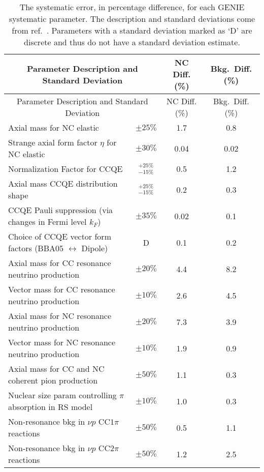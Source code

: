 \begin{doublespace}
\singlespacing
\begin{longtable}{p{3.5in} c c c}
  \caption[GENIE Systematic Errors]{The systematic error, in percentage difference, for each GENIE systematic parameter. The description and standard deviations come from ref.~\cite{ref:GENIE, ref:TNGENIE}. Parameters with a standard deviation marked as `D' are discrete and thus do not have a standard deviation estimate.} \tabularnewline
  \hline\hline
  \multicolumn{2}{c}{Parameter Description and Standard Deviation} & NC Diff. (\%) & Bkg.~Diff. (\%) \\
  \hline \endfirsthead
  \hline\hline
  \multicolumn{2}{c}{Parameter Description and Standard Deviation} & NC Diff. (\%) & Bkg.~Diff. (\%) \\
  \hline \endhead
  Axial mass for NC elastic & $\pm25\%$ & 1.7 & 0.8 \\
  Strange axial form factor $\eta$ for NC elastic & $\pm30\%$ & 0.04 & 0.02 \\
  Normalization Factor for CCQE & $^{+25\%}_{-15\%}$ & 0.5 & 1.2 \\
  Axial mass CCQE distribution shape & $^{+25\%}_{-15\%}$ & 0.2 & 0.3 \\
  CCQE Pauli suppression (via changes in Fermi level $k_F$) & $\pm35\%$ & 0.02 & 0.1 \\
  Choice of CCQE vector form factors \newline (BBA05 $\leftrightarrow$ Dipole) & D & 0.1 & 0.2 \\
  Axial mass for CC resonance neutrino production & $\pm20\%$ & 4.4 & 8.2 \\
  Vector mass for CC resonance neutrino \newline production & $\pm10\%$ & 2.6 & 4.5 \\
  Axial mass for NC resonance neutrino production & $\pm20\%$ & 7.3 & 3.9 \\
  Vector mass for NC resonance neutrino production & $\pm10\%$ & 1.9 & 0.9 \\
  Axial mass for CC and NC coherent pion \newline production & $\pm50\%$ & 1.1 & 0.3 \\
  Nuclear size param controlling $\pi$ absorption in RS model & $\pm10\%$ & 1.0 & 0.3 \\
  Non-resonance bkg in $\nu p$ CC$1\pi$ reactions & $\pm50\%$ & 0.5 & 1.1 \\
  Non-resonance bkg in $\nu p$ CC$2\pi$ reactions & $\pm50\%$ & 1.2 & 2.5 \\

\end{longtable}
\end{doublespace}
